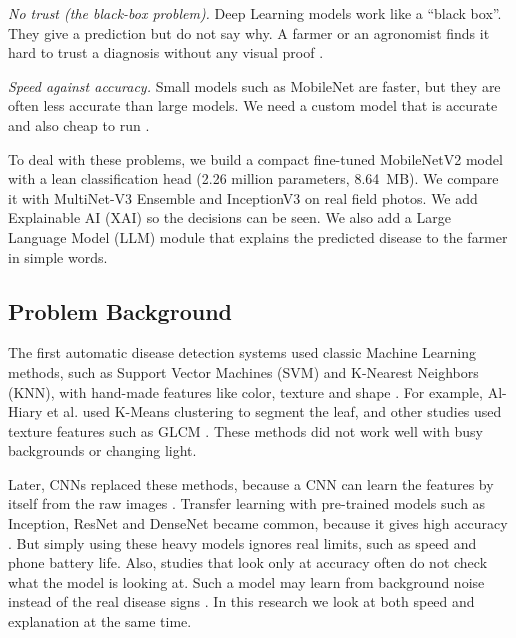 \textit{No trust (the black-box problem).} Deep Learning models work like a ``black box''. They give a prediction but do not say why. A farmer or an agronomist finds it hard to trust a diagnosis without any visual proof \cite{ryo2022explainable}.

\textit{Speed against accuracy.} Small models such as MobileNet are faster, but they are often less accurate than large models. We need a custom model that is accurate and also cheap to run \cite{kc2019depthwise}.

To deal with these problems, we build a compact fine-tuned MobileNetV2 model with a lean classification head (2.26 million parameters, 8.64~MB). We compare it with MultiNet-V3 Ensemble and InceptionV3 on real field photos. We add Explainable AI (XAI) so the decisions can be seen. We also add a Large Language Model (LLM) module that explains the predicted disease to the farmer in simple words.

\subsection{Problem Background}
The first automatic disease detection systems used classic Machine Learning methods, such as Support Vector Machines (SVM) and K-Nearest Neighbors (KNN), with hand-made features like color, texture and shape \cite{alhiary2011fast}. For example, Al-Hiary et al. used K-Means clustering to segment the leaf, and other studies used texture features such as GLCM \cite{pujari2016image, arivazhagan2013detection}. These methods did not work well with busy backgrounds or changing light.

Later, CNNs replaced these methods, because a CNN can learn the features by itself from the raw images \cite{ngugi2021recent}. Transfer learning with pre-trained models such as Inception, ResNet and DenseNet became common, because it gives high accuracy \cite{mohanty2016using, ferentinos2018deep}. But simply using these heavy models ignores real limits, such as speed and phone battery life. Also, studies that look only at accuracy often do not check what the model is looking at. Such a model may learn from background noise instead of the real disease signs \cite{amara2017deep}. In this research we look at both speed and explanation at the same time.

